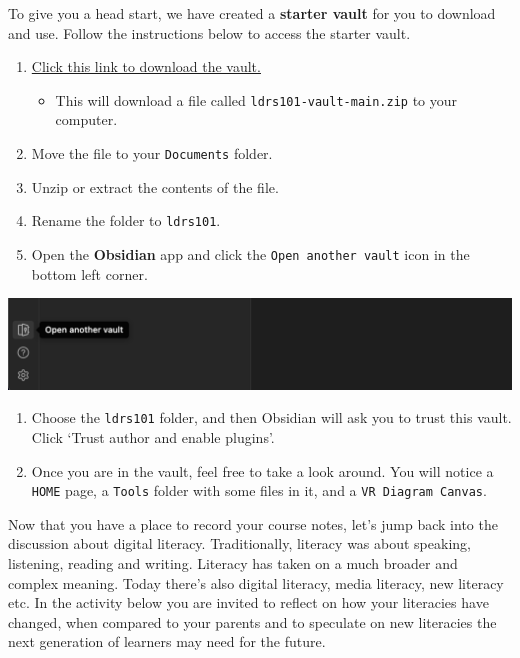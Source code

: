 \documentclass[
]{book}
\providecommand{\tightlist}{%
  \setlength{\itemsep}{0pt}\setlength{\parskip}{0pt}}
\theoremstyle{definition}
\theoremstyle{definition}
\theoremstyle{definition}
\theoremstyle{definition}
\theoremstyle{remark}
\begin{document}
\begin{reflect}
To give you a head start, we have created a \textbf{starter vault} for you to download and use. Follow the instructions below to access the starter vault.

\begin{enumerate}
\def\labelenumi{\arabic{enumi}.}
\tightlist
\item
  \href{https://github.com/twu-innovation/ldrs101-vault/archive/refs/heads/main.zip}{Click this link to download the vault.}

  \begin{itemize}
  \tightlist
  \item
    This will download a file called \texttt{ldrs101-vault-main.zip} to your computer.
  \end{itemize}
\item
  Move the file to your \texttt{Documents} folder.
\item
  Unzip or extract the contents of the file.
\item
  Rename the folder to \texttt{ldrs101}.
\item
  Open the \textbf{Obsidian} app and click the \texttt{Open\ another\ vault} icon in the bottom left corner.
\end{enumerate}

\includegraphics{assets/digital-literacy/obsidian2.png}

\begin{enumerate}
\def\labelenumi{\arabic{enumi}.}
\setcounter{enumi}{5}
\tightlist
\item
  Choose the \texttt{ldrs101} folder, and then Obsidian will ask you to trust this vault. Click `Trust author and enable plugins'.
\item
  Once you are in the vault, feel free to take a look around. You will notice a \texttt{HOME} page, a \texttt{Tools} folder with some files in it, and a \texttt{VR\ Diagram\ Canvas}.
\end{enumerate}
\end{reflect}

Now that you have a place to record your course notes, let's jump back into the discussion about digital literacy. Traditionally, literacy was about speaking, listening, reading and writing. Literacy has taken on a much broader and complex meaning. Today there's also digital literacy, media literacy, new literacy etc. In the activity below you are invited to reflect on how your literacies have changed, when compared to your parents and to speculate on new literacies the next generation of learners may need for the future.
\end{document}
